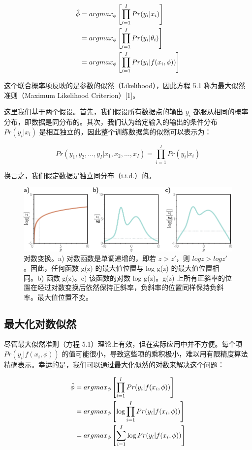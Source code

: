\documentclass[lang=cn,newtx,10pt,scheme=chinese]{elegantbook}
\begin{document}
\begin{align}
	\hat{\phi} &= argmax_{\phi} \left[ \prod_{i=1}^{I} Pr(y_i|x_i) \right] \notag \\
	&= argmax_{\phi} \left[ \prod_{i=1}^{I} Pr(y_i|\theta_i) \right] \notag \\
	&= argmax_{\phi} \left[ \prod_{i=1}^{I} Pr(y_i|f(x_i, \phi)) \right]  
\end{align} 


这个联合概率项反映的是参数的似然（Likelihood），因此方程 5.1 称为最大似然准则（Maximum Likelihood Criterion）[1]。

这里我们基于两个假设。首先，我们假设所有数据点的输出 \(y_i\) 都服从相同的概率分布，即数据是同分布的。其次，我们认为给定输入的输出的条件分布 \(Pr(y_i|x_i)\) 是相互独立的，因此整个训练数据集的似然可以表示为：

\begin{equation}
Pr(y_1, y_2, \ldots , y_I|x_1, x_2, \ldots , x_I) = \prod_{i=1}^{I} Pr(y_i|x_i) 
\end{equation}

换言之，我们假定数据是独立同分布（i.i.d.）的。

\begin{figure}[ht!]
	\centering
	\includegraphics[width=0.7\linewidth]{PDFFigures/UDLChap5PDF/LossLog.pdf}
	\caption{对数变换。a) 对数函数是单调递增的，即若 \(z > z \prime \)，则 \(log z > log z \prime\)。因此，任何函数 g(z) 的最大值位置与 log g(z) 的最大值位置相同。b) 函数 g(z)。c) 该函数的对数 log g(z)。g(z) 上所有正斜率的位置在经过对数变换后依然保持正斜率，负斜率的位置同样保持负斜率。最大值位置不变。}
\end{figure}

\subsection{最大化对数似然}
尽管最大似然准则（方程 5.1）理论上有效，但在实际应用中并不方便。每个项 \(Pr(y_i|f(x_i, \phi))\) 的值可能很小，导致这些项的乘积极小，难以用有限精度算法精确表示。幸运的是，我们可以通过最大化似然的对数来解决这个问题：


\begin{align}
	\hat{\phi} &= argmax_{\phi} \left[ \prod_{i=1}^{I} Pr(y_i|f(x_i, \phi)) \right] \notag \\
	&= argmax_{\phi} \left[ \log \prod_{i=1}^{I} Pr(y_i|f(x_i, \phi)) \right] \notag \\
	&= argmax_{\phi} \left[ \sum_{i=1}^{I} \log Pr(y_i|f(x_i, \phi)) \right] 
\end{align} 
\end{document}
